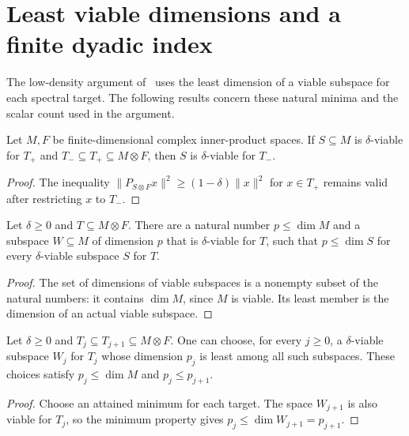 \section{Least viable dimensions and a finite dyadic index}

The low-density argument of~\cite[Proposition~prop:albootstrap-ld,
    lines 1112--1128]{Arad2016RigorousRG} uses the least dimension of a
viable subspace for each spectral target. The following results concern
these natural minima and the scalar count used in the argument.

\begin{theorem}
    \label{thm:viable_target_restriction}
    \leanok
    Let $M,F$ be finite-dimensional complex inner-product spaces.
    If $S\subseteq M$ is $\delta$-viable for $T_+$ and
    $T_-\subseteq T_+\subseteq M\otimes F$, then $S$ is
    $\delta$-viable for $T_-$.
\end{theorem}
\begin{proof}
    \leanok
    The inequality
    $\|P_{S\otimes F}x\|^2\ge(1-\delta)\|x\|^2$ for $x\in T_+$
    remains valid after restricting $x$ to $T_-$.
\end{proof}

\begin{theorem}
    \label{thm:viable_minimum}
    \leanok
    Let $\delta\ge0$ and $T\subseteq M\otimes F$.
    There are a natural number $p\le\dim M$ and a subspace
    $W\subseteq M$ of dimension $p$ that is $\delta$-viable for $T$,
    such that $p\le\dim S$ for every $\delta$-viable subspace $S$ for $T$.
\end{theorem}
\begin{proof}
    \leanok
    The set of dimensions of viable subspaces is a nonempty subset of
    the natural numbers: it contains $\dim M$, since $M$ is viable.
    Its least member is the dimension of an actual viable subspace.
\end{proof}

\begin{theorem}
    \label{thm:viable_minimum_sequence}
    \leanok
    Let $\delta\ge0$ and $T_j\subseteq T_{j+1}\subseteq M\otimes F$.
    One can choose, for every $j\ge0$, a $\delta$-viable subspace
    $W_j$ for $T_j$ whose dimension $p_j$ is least among all such
    subspaces. These choices satisfy $p_j\le\dim M$ and
    $p_j\le p_{j+1}$.
\end{theorem}
\begin{proof}
    \leanok
    Choose an attained minimum for each target. The space $W_{j+1}$
    is also viable for $T_j$, so the minimum property gives
    $p_j\le\dim W_{j+1}=p_{j+1}$.
\end{proof}

